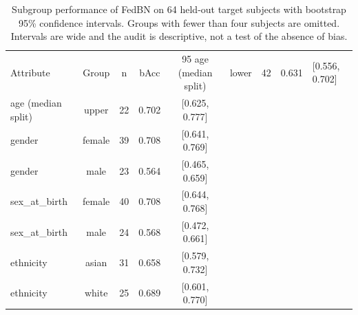 \begin{table}
\caption{Subgroup performance of FedBN on 64 held-out target subjects with bootstrap 95\% confidence intervals. Groups with fewer than four subjects are omitted. Intervals are wide and the audit is descriptive, not a test of the absence of bias.}
\label{tab:fair}
\begin{tabular}{lcccc}
\toprule
Attribute & Group & n & bAcc & 95%
\midrule
age (median split) & lower & 42 & 0.631 & [0.556, 0.702] \\
age (median split) & upper & 22 & 0.702 & [0.625, 0.777] \\
gender & female & 39 & 0.708 & [0.641, 0.769] \\
gender & male & 23 & 0.564 & [0.465, 0.659] \\
sex_at_birth & female & 40 & 0.708 & [0.644, 0.768] \\
sex_at_birth & male & 24 & 0.568 & [0.472, 0.661] \\
ethnicity & asian & 31 & 0.658 & [0.579, 0.732] \\
ethnicity & white & 25 & 0.689 & [0.601, 0.770] \\
\bottomrule
\end{tabular}
\end{table}
